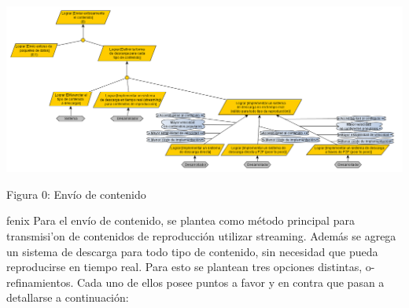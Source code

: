 \documentclass[11pt, a4paper, spanish]{article}
\begin{document}
\newpage
	\begin{center}
		\includegraphics[scale=0.48, angle=90]{Diagramas/0ModelodeObjetivosLograrenviarcontenido.png}
	\end{center}
	\begin{center}
		\small{Figura 0: Env\'io de contenido}
	\end{center}

fenix
		Para el env\'io de contenido, se plantea como m\'etodo principal para transmisi'on de contenidos de reproducci\'on utilizar streaming. 
	Adem\'as se agrega un sistema de descarga para todo tipo de contenido, sin necesidad que pueda reproducirse en tiempo real. Para esto se 	
	plantean tres opciones distintas, o-refinamientos. Cada uno de ellos posee puntos a favor y en contra que pasan a detallarse a continuaci\'on:
\end{document}
